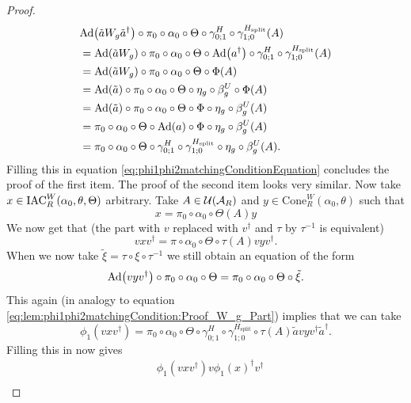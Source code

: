 \documentclass[12pt,a4paper,twoside]{article}
\numberwithin{equation}{section}
\begin{document}
\begin{proof}
	\begin{align}
		&\Ad{\tilde{a}W_g\tilde{a}^\dagger}\circ\pi_0\circ\alpha_0\circ\Theta\circ \gamma^{H}_{0;1}\circ\gamma^{H_\text{split}}_{1;0}(A)\\
		&=\Ad{\tilde{a}W_g}\circ\pi_0\circ\alpha_0\circ\Theta\circ\Ad{a^\dagger}\circ \gamma^{H}_{0;1}\circ\gamma^{H_\text{split}}_{1;0}(A)\\
		&=\Ad{\tilde{a}W_g}\circ\pi_0\circ\alpha_0\circ\Theta\circ\Phi(A)\\
		&=\Ad{\tilde{a}}\circ\pi_0\circ\alpha_0\circ\Theta\circ\eta_g\circ\beta_g^U\circ\Phi(A)\\
		&=\Ad{\tilde{a}}\circ\pi_0\circ\alpha_0\circ\Theta\circ\Phi\circ\eta_g\circ\beta_g^U(A)\\
		&=\pi_0\circ\alpha_0\circ\Theta\circ\Ad{a}\circ\Phi\circ\eta_g\circ\beta_g^U(A)\\
		&=\pi_0\circ\alpha_0\circ\Theta\circ \gamma^{H}_{0;1}\circ\gamma^{H_\text{split}}_{1;0} \circ\eta_g\circ\beta_g^U(A).
	\end{align}
	Filling this in equation \eqref{eq:phi1phi2matchingConditionEquation} concludes the proof of the first item. The proof of the second item looks very similar. Now take $x\in \textrm{IAC}_R^W(\alpha_0,\theta,\Theta)$ arbitrary. Take $A\in\mathcal U(\mathcal A_R)$ and $y\in\text{Cone}_R^W(\alpha_0,\theta)$ such that
	\begin{equation}
		x=\pi_0\circ\alpha_0\circ\Theta(A)y
	\end{equation}
	We now get that (the part with $v$ replaced with $v^\dagger$ and $\tau$ by $\tau^{-1}$ is equivalent)
	\begin{equation}
		vxv^\dagger=\pi\circ\alpha_0\circ\Theta\circ\tau(A)vyv^\dagger.
	\end{equation}
	When we now take $\tilde\xi=\tau\circ\xi\circ\tau^{-1}$ we still obtain an equation of the form
	\begin{equation}
		\Ad{vyv^\dagger}\circ \pi_0\circ\alpha_0\circ\Theta=\pi_0\circ\alpha_0\circ\Theta\circ\tilde\xi.
	\end{equation}
	This again (in analogy to equation \eqref{eq:lem:phi1phi2matchingCondition:Proof_W_g_Part}) implies that we can take
	\begin{equation}
		\phi_1(vxv^\dagger)=\pi_0\circ\alpha_0\circ\Theta\circ\gamma^{H}_{0;1}\circ\gamma^{H_{\text{split}}}_{1;0}\circ\tau(A)\tilde{a}vyv^\dagger\tilde{a}^\dagger.
	\end{equation}
	Filling this in now gives
	\begin{align}
	&\phi_1(vxv^\dagger)v\phi_1(x)^\dagger v^\dagger\\

\end{align}
\end{proof}
\end{document}
